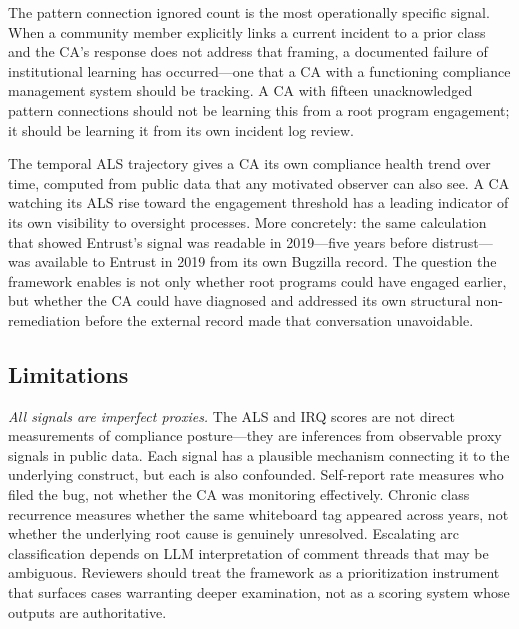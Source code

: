 \documentclass[10pt,twocolumn,letterpaper]{article}
\begin{document}
The pattern connection ignored count is the most operationally specific signal.
When a community member explicitly links a current incident to a prior class and the
CA's response does not address that framing, a documented failure of institutional
learning has occurred---one that a CA with a functioning compliance management system
should be tracking. A CA with fifteen unacknowledged pattern connections should not
be learning this from a root program engagement; it should be learning it from its
own incident log review.

The temporal ALS trajectory gives a CA its own compliance health trend over time,
computed from public data that any motivated observer can also see. A CA watching
its ALS rise toward the engagement threshold has a leading indicator of its own
visibility to oversight processes. More concretely: the same calculation that showed
Entrust's signal was readable in 2019---five years before distrust---was available
to Entrust in 2019 from its own Bugzilla record. The question the framework enables
is not only whether root programs could have engaged earlier, but whether the CA
could have diagnosed and addressed its own structural non-remediation before the
external record made that conversation unavoidable.

\subsection{Limitations}
\label{sec:limitations}

\textit{All signals are imperfect proxies.} The ALS and IRQ scores are not direct
measurements of compliance posture---they are inferences from observable proxy signals
in public data. Each signal has a plausible mechanism connecting it to the underlying
construct, but each is also confounded. Self-report rate measures who filed the bug, not
whether the CA was monitoring effectively. Chronic class recurrence measures whether the
same whiteboard tag appeared across years, not whether the underlying root cause is
genuinely unresolved. Escalating arc classification depends on LLM interpretation of
comment threads that may be ambiguous. Reviewers should treat the framework as a
prioritization instrument that surfaces cases warranting deeper examination, not as a
scoring system whose outputs are authoritative.
\end{document}
